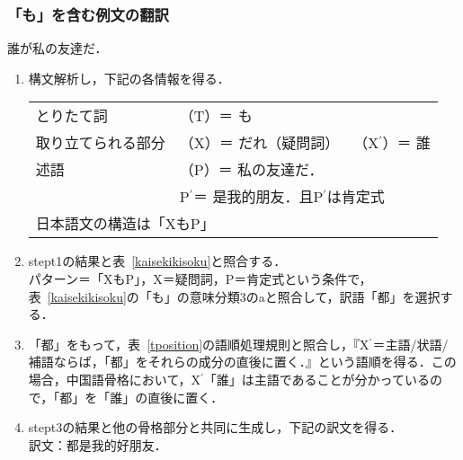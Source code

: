 \newpage

\subsubsection{「も」を含む例文の翻訳}
\begin{enumerates}
 \setcounter{enumi}{17}
 \item 誰が私の友達だ．
       \begin{enumerate}
	\item 構文解析し，下記の各情報を得る．\\
	      \begin{tabular}{lll}
	       とりたて詞 & （T）＝ も \\
	       取り立てられる部分 & （X）＝ だれ（疑問詞） & （X$^{\prime}$）＝ 誰 \\
	       述語 & （P）＝ 私の友達だ． \\
	       & \multicolumn{2}{l}{P$^{\prime}$＝ 是我的朋友．且P$^{\prime}$は肯定式} \\
	       \multicolumn{3}{l}{日本語文の構造は「XもP」} \\
	      \end{tabular}
	\item stept1の結果と表~\ref{kaisekikisoku}と照合する．\\
	      パターン＝「XもP」，X＝疑問詞，P＝肯定式という条件で，表~\ref{kaisekikisoku}の「も」の意味分類3のaと照合して，訳語「都」を選択する．
	
	\item 「都」をもって，表~\ref{tposition}の語順処理規則と照合し，『X$^{\prime}$＝主語/状語/補語ならば，「都」をそれらの成分の直後に置く．』という語順を得る．この場合，中国語骨格において，X$^{\prime}$「誰」は主語であることが分かっているので，「都」を「誰」の直後に置く．
	\item stept3の結果と他の骨格部分と共同に生成し，下記の訳文を得る．\\
	      訳文：都是我的好朋友．
       \end{enumerate}
\end{enumerates}

